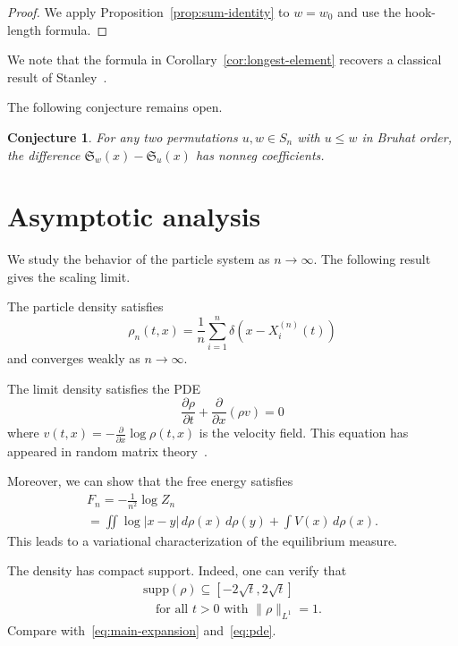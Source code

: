 \documentclass{amsart}
\theoremstyle{plain}
\newtheorem{conjecture}[theorem]{Conjecture}
\theoremstyle{definition}
\theoremstyle{remark}
\begin{document}
\begin{proof}
We apply Proposition~\ref{prop:sum-identity} to $w = w_0$ and use
the hook-length formula.
\end{proof}

We note that the formula in Corollary~\ref{cor:longest-element}
recovers a classical result of Stanley~\cite{Stanley1984}.

The following conjecture remains open.

\begin{conjecture}
\label{conj:positivity}
For any two permutations $u, w \in S_n$ with $u \leq w$ in Bruhat order,
the difference $\mathfrak{S}_w(x) - \mathfrak{S}_u(x)$ has nonneg
coefficients.
\end{conjecture}

\section{Asymptotic analysis}
\label{sec:asymptotics}

We study the behavior of the particle system as $n \to \infty$.
The following result gives the scaling limit.

The particle density satisfies
\[
\rho_n(t, x) = \frac{1}{n} \sum_{i=1}^{n} \delta(x - X_i^{(n)}(t))
\]
and converges weakly as $n \to \infty$.

The limit density satisfies the PDE
\begin{equation}
\label{eq:pde}
\frac{\partial \rho}{\partial t} + \frac{\partial}{\partial x}(\rho v) = 0
\end{equation}
where $v(t,x) = -\frac{\partial}{\partial x} \log \rho(t,x)$ is the velocity
field. This equation has appeared in random matrix theory~\cite{AGZ2010}.

Moreover, we can show that the free energy satisfies
\begin{gather}
\label{eq:free-energy-a}
F_n = -\frac{1}{n^2} \log Z_n \\
\label{eq:free-energy-b}
= \iint \log|x - y|\, d\rho(x)\, d\rho(y) + \int V(x)\, d\rho(x).
\end{gather}
This leads to a variational characterization of the equilibrium measure.

The density has compact support. Indeed, one can verify that
\begin{multline}
\label{eq:support-bound}
\mathrm{supp}(\rho) \subseteq [-2\sqrt{t}, 2\sqrt{t}] \\
\quad \text{for all } t > 0 \text{ with } \|\rho\|_{L^1} = 1.
\end{multline}
Compare with~\eqref{eq:main-expansion} and~\ref{eq:pde}.
\end{document}
